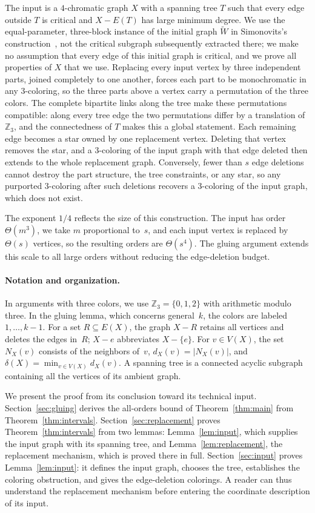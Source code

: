\documentclass[11pt,letterpaper]{article}
\numberwithin{equation}{section}
\theoremstyle{plain}
\theoremstyle{definition}
\theoremstyle{remark}
\newcommand{\Z}{\mathbb{Z}}
\begin{document}
The input is a $4$-chromatic graph $X$ with a spanning tree $T$ such that every edge outside $T$ is critical and $X-E(T)$ has large minimum degree. We use the equal-parameter, three-block instance of the initial graph $\widetilde W$ in Simonovits's construction~\cite[pp.~74--79]{Simonovits}, not the critical subgraph subsequently extracted there; we make no assumption that every edge of this initial graph is critical, and we prove all properties of $X$ that we use. Replacing every input vertex by three independent parts, joined completely to one another, forces each part to be monochromatic in any $3$-coloring, so the three parts above a vertex carry a permutation of the three colors. The complete bipartite links along the tree make these permutations compatible: along every tree edge the two permutations differ by a translation of $\Z_3$, and the connectedness of $T$ makes this a global statement. Each remaining edge becomes a star owned by one replacement vertex. Deleting that vertex removes the star, and a $3$-coloring of the input graph with that edge deleted then extends to the whole replacement graph. Conversely, fewer than $s$ edge deletions cannot destroy the part structure, the tree constraints, or any star, so any purported $3$-coloring after such deletions recovers a $3$-coloring of the input graph, which does not exist.

The exponent $1/4$ reflects the size of this construction. The input has order $\Theta(m^3)$, we take $m$ proportional to~$s$, and each input vertex is replaced by $\Theta(s)$ vertices, so the resulting orders are $\Theta(s^4)$. The gluing argument extends this scale to all large orders without reducing the edge-deletion budget.

\paragraph{Notation and organization.}
In arguments with three colors, we use $\Z_3=\{0,1,2\}$ with arithmetic modulo three. In the gluing lemma, which concerns general~$k$, the colors are labeled $1,\dots,k-1$. For a set $R\subseteq E(X)$, the graph $X-R$ retains all vertices and deletes the edges in~$R$; $X-e$ abbreviates $X-\{e\}$. For $v\in V(X)$, the set $N_X(v)$ consists of the neighbors of~$v$, $d_X(v)=|N_X(v)|$, and $\delta(X)=\min_{v\in V(X)}d_X(v)$. A spanning tree is a connected acyclic subgraph containing all the vertices of its ambient graph.

We present the proof from its conclusion toward its technical input. Section~\ref{sec:gluing} derives the all-orders bound of Theorem~\ref{thm:main} from Theorem~\ref{thm:intervals}. Section~\ref{sec:replacement} proves Theorem~\ref{thm:intervals} from two lemmas: Lemma~\ref{lem:input}, which supplies the input graph with its spanning tree, and Lemma~\ref{lem:replacement}, the replacement mechanism, which is proved there in full. Section~\ref{sec:input} proves Lemma~\ref{lem:input}: it defines the input graph, chooses the tree, establishes the coloring obstruction, and gives the edge-deletion colorings. A reader can thus understand the replacement mechanism before entering the coordinate description of its input.
\end{document}
